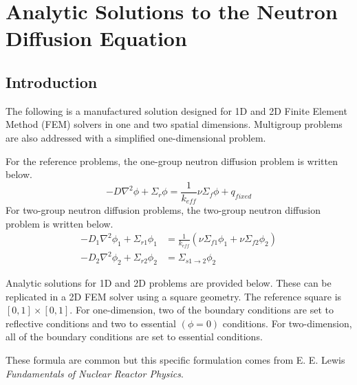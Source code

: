 \chapter{Analytic Solutions to the Neutron Diffusion Equation}

\section{Introduction}
  The following is a manufactured solution designed for 1D and 2D Finite Element 
  Method (FEM) solvers in one and two spatial dimensions. Multigroup 
  problems are also addressed with a simplified one-dimensional problem.
  
  For the reference problems, the one-group neutron diffusion problem is written
  below.
  \begin{equation} \label{eq:onegroup}
    -D \nabla^2 \phi + \Sigma_r \phi =  \frac{1}{k_{eff}} \nu \Sigma_f \phi + 
      q_{fixed}
  \end{equation}
  For two-group neutron diffusion problems, the two-group neutron diffusion 
  problem is written below.
  \begin{align} 
    -D_1 \nabla^2 \phi_1 + \Sigma_{r1} \phi_1 &= \frac{1}{k_{eff}} \left(
      \nu \Sigma_{f1} \phi_1 + \nu \Sigma_{f2} \phi_2 \right) \\
    -D_2 \nabla^2 \phi_2 + \Sigma_{r2} \phi_2 &= 
      \Sigma_{s 1 \rightarrow 2} \phi_2
  \end{align}

Analytic solutions for 1D and 2D problems are provided below. These can be 
replicated in a 2D FEM solver using a square geometry. The reference square is 
$[0,1]\times[0,1]$. For one-dimension, two of the boundary conditions are set to
reflective conditions and two to essential $(\phi = 0)$ conditions. For 
two-dimension, all of the boundary conditions are set to essential conditions.

These formula are common but this specific formulation comes from E. E. Lewis
\textit{Fundamentals of Nuclear Reactor Physics}.

